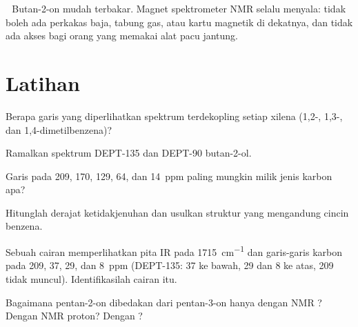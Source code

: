 \begin{safety}{\,\,}
Butan-2-on mudah terbakar. Magnet spektrometer NMR selalu menyala: tidak
boleh ada perkakas baja, tabung gas, atau kartu magnetik di dekatnya, dan
tidak ada akses bagi orang yang memakai alat pacu jantung.
\end{safety}

\section{Latihan}

\begin{exercise}[$\star$]\label{exo:b2:structure-determination:1}
Berapa garis yang diperlihatkan spektrum  terdekopling setiap
xilena (1,2-, 1,3-, dan
1,4-dimetilbenzena)?
\end{exercise}

\begin{exercise}[$\star$]\label{exo:b2:structure-determination:2}
Ramalkan spektrum DEPT-135 dan DEPT-90 butan-2-ol.
\end{exercise}

\begin{exercise}[$\star$]\label{exo:b2:structure-determination:3}
Garis pada 209, 170, 129, 64, dan 14~ppm paling mungkin milik jenis karbon apa?
\end{exercise}

\begin{exercise}[$\star$]\label{exo:b2:structure-determination:4}
Hitunglah derajat ketidakjenuhan  dan usulkan struktur yang mengandung cincin benzena.
\end{exercise}

\begin{exercise}[$\star\star$]\label{exo:b2:structure-determination:5}
Sebuah cairan  memperlihatkan pita IR pada \qty{1715}{cm^{-1}} dan
garis-garis karbon pada 209, 37, 29, dan 8~ppm (DEPT-135: 37 ke bawah, 29
dan 8 ke atas, 209 tidak muncul). Identifikasilah cairan itu.
\end{exercise}

\begin{exercise}[$\star\star$]\label{exo:b2:structure-determination:6}
Bagaimana pentan-2-on dibedakan dari pentan-3-on hanya dengan NMR
? Dengan NMR proton? Dengan ?
\end{exercise}

